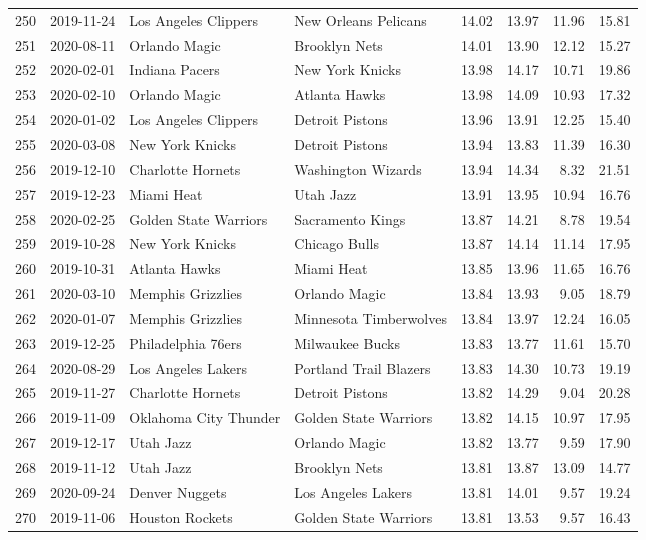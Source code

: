 \documentclass[
  11pt,
]{article}
\theoremstyle{nonumberplain}
\begin{document}
\begin{longtable}{rl|llr|rrr}
250 & 2019-11-24 & Los Angeles Clippers & New Orleans Pelicans & 14.02 & 13.97 & 11.96 & 15.81\\
251 & 2020-08-11 & Orlando Magic & Brooklyn Nets & 14.01 & 13.90 & 12.12 & 15.27\\
252 & 2020-02-01 & Indiana Pacers & New York Knicks & 13.98 & 14.17 & 10.71 & 19.86\\
253 & 2020-02-10 & Orlando Magic & Atlanta Hawks & 13.98 & 14.09 & 10.93 & 17.32\\
254 & 2020-01-02 & Los Angeles Clippers & Detroit Pistons & 13.96 & 13.91 & 12.25 & 15.40\\
255 & 2020-03-08 & New York Knicks & Detroit Pistons & 13.94 & 13.83 & 11.39 & 16.30\\
256 & 2019-12-10 & Charlotte Hornets & Washington Wizards & 13.94 & 14.34 & 8.32 & 21.51\\
257 & 2019-12-23 & Miami Heat & Utah Jazz & 13.91 & 13.95 & 10.94 & 16.76\\
258 & 2020-02-25 & Golden State Warriors & Sacramento Kings & 13.87 & 14.21 & 8.78 & 19.54\\
259 & 2019-10-28 & New York Knicks & Chicago Bulls & 13.87 & 14.14 & 11.14 & 17.95\\
260 & 2019-10-31 & Atlanta Hawks & Miami Heat & 13.85 & 13.96 & 11.65 & 16.76\\
261 & 2020-03-10 & Memphis Grizzlies & Orlando Magic & 13.84 & 13.93 & 9.05 & 18.79\\
262 & 2020-01-07 & Memphis Grizzlies & Minnesota Timberwolves & 13.84 & 13.97 & 12.24 & 16.05\\
263 & 2019-12-25 & Philadelphia 76ers & Milwaukee Bucks & 13.83 & 13.77 & 11.61 & 15.70\\
264 & 2020-08-29 & Los Angeles Lakers & Portland Trail Blazers & 13.83 & 14.30 & 10.73 & 19.19\\
265 & 2019-11-27 & Charlotte Hornets & Detroit Pistons & 13.82 & 14.29 & 9.04 & 20.28\\
266 & 2019-11-09 & Oklahoma City Thunder & Golden State Warriors & 13.82 & 14.15 & 10.97 & 17.95\\
267 & 2019-12-17 & Utah Jazz & Orlando Magic & 13.82 & 13.77 & 9.59 & 17.90\\
268 & 2019-11-12 & Utah Jazz & Brooklyn Nets & 13.81 & 13.87 & 13.09 & 14.77\\
269 & 2020-09-24 & Denver Nuggets & Los Angeles Lakers & 13.81 & 14.01 & 9.57 & 19.24\\
270 & 2019-11-06 & Houston Rockets & Golden State Warriors & 13.81 & 13.53 & 9.57 & 16.43\\

\end{longtable}
\end{document}
